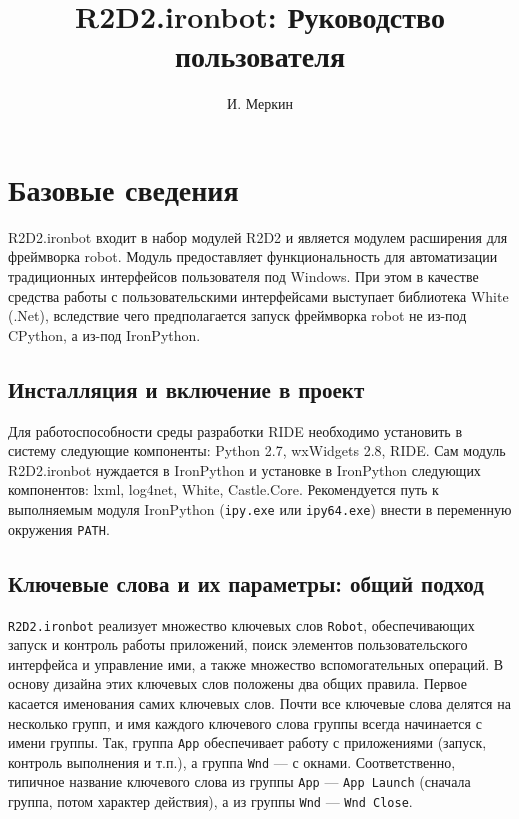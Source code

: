 \documentclass[11pt]{book} %
\title{R2D2.ironbot: Руководство пользователя}
\author{И. Меркин}
\begin{document}
\maketitle

\tableofcontents

\chapter{Базовые сведения}

R2D2.ironbot входит в набор модулей R2D2 и является модулем расширения для фреймворка robot. Модуль предоставляет функциональность для автоматизации традиционных интерфейсов пользователя под Windows. При этом в качестве средства работы с пользовательскими интерфейсами выступает библиотека White (.Net), вследствие чего предполагается запуск фреймворка robot не из-под CPython, а из-под IronPython.

\section{Инсталляция и включение в проект}

Для работоспособности среды разработки RIDE необходимо установить в систему следующие компоненты: Python 2.7, wxWidgets 2.8, RIDE. Сам модуль R2D2.ironbot нуждается в IronPython и установке в IronPython следующих компонентов: lxml, log4net, White, Castle.Core. Рекомендуется путь к выполняемым модуля IronPython (\verb|ipy.exe| или \verb|ipy64.exe|) внести в переменную окружения \verb|PATH|.


\section{Ключевые слова и их параметры: общий подход}

\verb|R2D2.ironbot| реализует множество ключевых слов \verb|Robot|, обеспечивающих запуск и контроль работы приложений, поиск элементов пользовательского интерфейса и управление ими, а также множество вспомогательных операций. В основу дизайна этих ключевых слов положены два общих правила. Первое касается именования самих ключевых слов. Почти все ключевые слова делятся на несколько групп, и имя каждого ключевого слова группы всегда начинается с имени группы. Так, группа \verb"App" обеспечивает работу с приложениями (запуск, контроль выполнения и т.п.), а группа \verb"Wnd" --- с окнами. Соответственно, типичное название ключевого слова из группы \verb"App" --- \verb"App Launch" (сначала группа, потом характер действия), а из группы \verb"Wnd"  --- \verb"Wnd Close".
\end{document}
